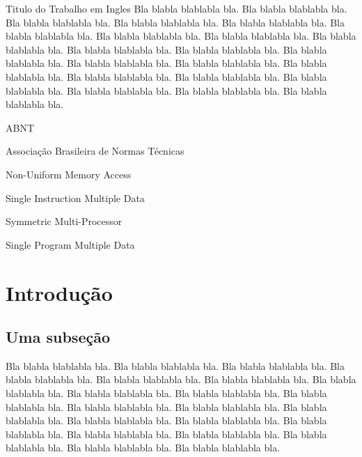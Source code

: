 \documentclass[diss,capa]{texufpel}
\begin{document}
\begin{englishabstract}{Titulo do Trabalho em Ingles}
Bla blabla blablabla bla.  Bla blabla blablabla bla.  Bla blabla
blablabla bla.  Bla blabla blablabla bla.  Bla blabla blablabla bla.
Bla blabla blablabla bla.  Bla blabla blablabla bla.  Bla blabla
blablabla bla.  Bla blabla blablabla bla.  Bla blabla blablabla bla.
Bla blabla blablabla bla.  Bla blabla blablabla bla.  Bla blabla
blablabla bla.  Bla blabla blablabla bla.  Bla blabla blablabla bla.
Bla blabla blablabla bla.  Bla blabla blablabla bla.  Bla blabla
blablabla bla.  Bla blabla blablabla bla.  Bla blabla blablabla bla.
Bla blabla blablabla bla.
\end{englishabstract}

\listoffigures

\listoftables

\begin{listofabbrv}{ABNT}%
        \item[ABNT] Associação Brasileira de Normas Técnicas
        \item[NUMA] Non-Uniform Memory Access
        \item[SIMD] Single Instruction Multiple Data
        \item[SMP] Symmetric Multi-Processor
        \item[SPMD] Single Program Multiple Data
\end{listofabbrv}

\tableofcontents

\chapter{Introdução}

\section{Uma subseção}
Bla blabla blablabla bla.  Bla blabla blablabla bla.  Bla blabla
blablabla bla.  Bla blabla blablabla bla.  Bla blabla blablabla bla.
Bla blabla blablabla bla.  Bla blabla blablabla bla.  Bla blabla
blablabla bla.  Bla blabla blablabla bla.  Bla blabla blablabla bla.
Bla blabla blablabla bla.  Bla blabla blablabla bla.  Bla blabla
blablabla bla.  Bla blabla blablabla bla.  Bla blabla blablabla bla.
Bla blabla blablabla bla.  Bla blabla blablabla bla.  Bla blabla
blablabla bla.  Bla blabla blablabla bla.  Bla blabla blablabla bla.
Bla blabla blablabla bla.
\end{document}
